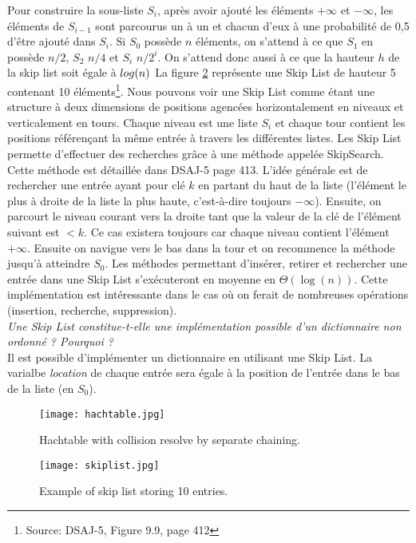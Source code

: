 \begin{enumerate}
			Pour construire la sous-liste $S_i$, après avoir ajouté les éléments $+\infty$ et $-\infty$, les éléments de $S_{i-1}$ sont parcourus un à un et chacun d'eux à une probabilité de 0,5 d'être ajouté dans $S_i$. Si $S_0$ possède $n$ éléments, on s'attend à ce que $S_1$ en possède $n/2$, $S_2$ $n/4$ et $S_i$ $n/2^i$. On s'attend donc aussi à ce que la hauteur $h$ de la skip list soit égale à $\\log (n)$
			La figure \ref{fig:skiplist} représente une Skip List de hauteur 5 contenant 10 éléments\footnote{Source: DSAJ-5, Figure 9.9, page 412}.
			Nous pouvons voir une Skip List comme étant une structure à deux dimensions de positions agencées horizontalement en niveaux et verticalement en tours. Chaque niveau est une liste $S_i$ et chaque tour contient les positions référençant la même entrée à travers les différentes listes.
			Les Skip List permette d'effectuer des recherches grâce à une méthode appelée SkipSearch. Cette méthode est détaillée dans DSAJ-5 page 413. L'idée générale est de rechercher une entrée ayant pour clé $k$ en partant du haut de la liste (l'élément le plus à droite de la liste la plus haute, c'est-à-dire toujours $-\infty$). Ensuite, on parcourt le niveau courant vers la droite tant que la valeur de la clé de l'élément suivant est $< k$. Ce cas existera toujours car chaque niveau contient l'élément $+\infty$. Ensuite on navigue vers le bas dans la tour et on recommence la méthode jusqu'à atteindre $S_0$.
			Les méthodes permettant d'insérer, retirer et rechercher une entrée dans une Skip List s'exécuteront en moyenne en $\Theta(\log(n))$.
			Cette implémentation est intéressante dans le cas où on ferait de nombreuses opérations (insertion, recherche, suppression).
			\\
			\textit{Une \textit{Skip List} constitue-t-elle une implémentation possible d'un dictionnaire non ordonné ? Pourquoi ?}
			\\
			Il est possible d'implémenter un dictionnaire en utilisant une Skip List. La varialbe \textit{location} de chaque entrée sera égale à la position de l'entrée dans le bas de la liste (en $S_0$).
\end{enumerate}

\begin{figure}
	\centering
	\texttt{[image: hachtable.jpg]}
	\caption{Hachtable with collision resolve by separate chaining.}
	\label{fig:hashtable}
\end{figure}

\begin{figure}
	\centering
	\texttt{[image: skiplist.jpg]}
	\caption{Example of skip list storing 10 entries.}
	\label{fig:skiplist}
\end{figure}